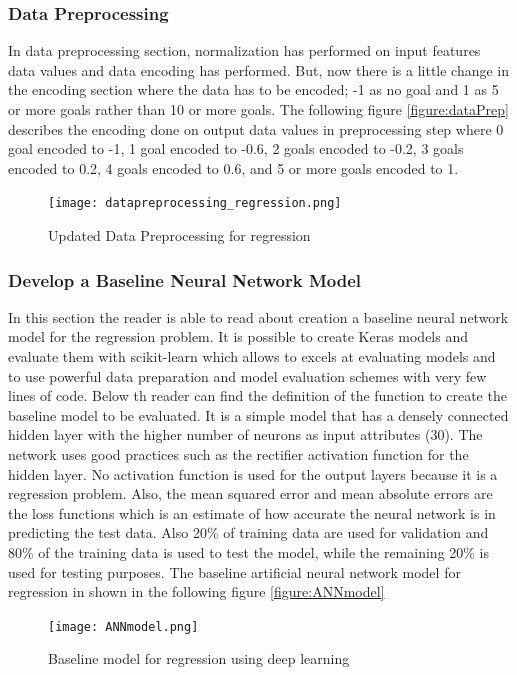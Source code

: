 \subsubsection{Data Preprocessing}
In data preprocessing section, normalization has performed on input features data values and data encoding has performed. But, now there is a little change in the encoding section where the data has to be encoded; -1 as no goal and 1 as 5 or more goals rather than 10 or more goals.\newline
The following figure \autoref{figure:dataPrep} describes the encoding done on output data values in preprocessing step where 0 goal encoded to -1, 1 goal encoded to -0.6, 2 goals encoded to -0.2, 3 goals encoded to 0.2, 4 goals encoded to 0.6, and 5 or more goals encoded to 1.\newline
\begin{figure}[H]
\begin{center}
\texttt{[image: datapreprocessing\_regression.png]}
\end{center}
\caption{Updated Data Preprocessing for regression }
\label{figure:dataPrep1}
\end{figure}
\subsubsection{Develop a Baseline Neural Network Model}
In this section the reader is able to read about creation a baseline neural network model for the regression problem. It is possible to create Keras models and evaluate them with scikit-learn which allows to excels at evaluating models and to use powerful data preparation and model evaluation schemes with very few lines of code.\newline
Below th reader can find the definition of the function to create the baseline model to be evaluated. It is a simple model that has a densely connected hidden layer with the higher number of neurons as input attributes (30). The network uses good practices such as the rectifier activation function for the hidden layer. No activation function is used for the output layers because it is a regression problem.\newline
Also, the mean squared error and mean absolute errors are the loss functions which is an estimate of how accurate the neural network is in predicting the test data. Also 20\% of training data are used for validation and 80\% of the training data is used to test the model, while the remaining 20\% is used for testing purposes.\newline
The baseline artificial neural network model for regression in shown in the following figure \autoref{figure:ANNmodel} \newline
\begin{figure}[H]
\begin{center}
\texttt{[image: ANNmodel.png]}
\end{center}
\caption{Baseline model for regression using deep learning }
\label{figure:ANNmodel}
\end{figure}
